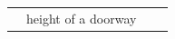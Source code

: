 {\begin{tabular}[t]{|l|l|l|l|}
    
     \tabularnewline\cline{1-1}\cline{2-2}\cline{3-3}\cline{4-4}
    
    
         &
    
    
        height of a doorway &
    
    
         &
    
    
     \tabularnewline\cline{1-1}\cline{2-2}\cline{3-3}\cline{4-4}
    \end{tabular}} %
        \addtolength{\mytableboxheight}{\mytableboxdepth}
        \addtocounter{footnote}{-0}
        
